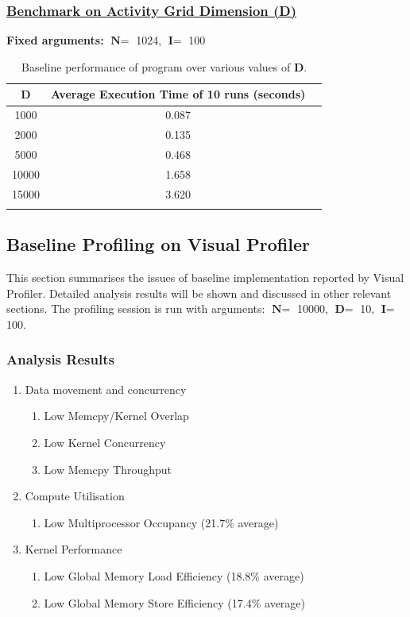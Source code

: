 \documentclass[12pt, a4paper]{article}
\begin{document}
\subsubsection*{\underline{Benchmark on Activity Grid Dimension (D)}}
\textbf{Fixed arguments:} $\textbf{N} =$ 1024, $\textbf{I} =$ 100
\renewcommand{\arraystretch}{1.3}
\begin{longtable}{|c|c|c|}
  \hline \endfirsthead \rowcolor{lightgray}
  D     & Average Execution Time of 10 runs (seconds) \\ \hline
  1000  & 0.087                                       \\
  2000  & 0.135                                       \\
  5000  & 0.468                                       \\
  10000 & 1.658                                       \\
  15000 & 3.620                                       \\ \hline
  \caption{Baseline performance of program over various values of \textbf{D}.}
  \label{table:baseline_d}
\end{longtable}
\renewcommand{\arraystretch}{1}

\subsection{Baseline Profiling on Visual Profiler}
This section summarises the issues of baseline implementation reported by Visual Profiler. Detailed
analysis results will be shown and discussed in other relevant sections. The profiling session is
run with arguments: $\textbf{N} =$ 10000, $\textbf{D} =$ 10, $\textbf{I} =$ 100.

\subsubsection{Analysis Results} \label{subsubsec:baseline_analysis_results}
\begin{enumerate}
  \item Data movement and concurrency
    \begin{enumerate}
      \item Low Memcpy/Kernel Overlap
      \item Low Kernel Concurrency
      \item Low Memcpy Throughput
    \end{enumerate}

  \item Compute Utilisation
    \begin{enumerate}
      \item Low Multiprocessor Occupancy (21.7\% average)
    \end{enumerate}

  \item Kernel Performance
    \begin{enumerate}
      \item Low Global Memory Load Efficiency (18.8\% average)
      \item Low Global Memory Store Efficiency (17.4\% average)
    \end{enumerate}
\end{enumerate}
\end{document}
